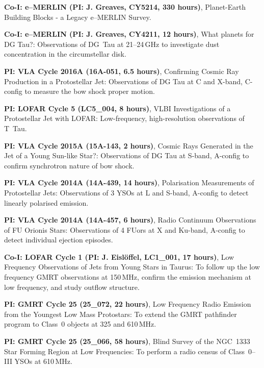 
\begin{cvpubs}
  \cvpub
    {
      \begin{cvlist}
        \item {\textbf{Co-I: e--MERLIN (PI: J. Greaves, CY5214, 330 hours)}, Planet-Earth Building Blocks - a Legacy e--MERLIN Survey.}
  \item {\textbf{Co-I: e--MERLIN (PI: J. Greaves, CY4211, 12 hours)}, What planets for DG Tau?: Observations of DG~Tau at 21--24\,GHz to investigate dust concentration in the circumstellar disk.}
  \item {\textbf{PI: VLA Cycle 2016A (16A-051, 6.5 hours)}, Confirming Cosmic Ray Production in a Protostellar Jet: Observations of DG Tau at C and X-band, C-config to measure the bow shock proper motion.}
  \item {\textbf{PI: LOFAR Cycle 5 (LC5\_004, 8 hours)}, VLBI Investigations of a Protostellar Jet with LOFAR: Low-frequency, high-resolution observations of T~Tau.}
  \item {\textbf{PI: VLA Cycle 2015A (15A-143, 2 hours)}, Cosmic Rays Generated in the Jet of a Young Sun-like Star?: Observations of DG Tau at S-band, A-config to confirm synchrotron nature of bow shock.}
  \item {\textbf{PI: VLA Cycle 2014A (14A-439, 14 hours)}, Polarisation Measurements of Protostellar Jets: Observations of 3 YSOs at L and S-band, A-config to detect linearly polarised emission.}
  \item {\textbf{PI: VLA Cycle 2014A (14A-457, 6 hours)}, Radio Continuum Observations of FU Orionis Stars: Observations of 4 FUors at X and Ku-band, A-config to detect individual ejection episodes.}
  \item {\textbf{Co-I: LOFAR Cycle 1 (PI: J. Eisl{\"o}ffel, LC1\_001, 17 hours)}, Low Frequency Observations of Jets from Young Stars in Taurus: To follow up the low frequency GMRT observations at 150\,MHz, confirm the emission mechanism at low frequency, and study outflow structure.}
  \item {\textbf{PI: GMRT Cycle 25 (25\_072, 22 hours)}, Low Frequency Radio Emission from the Youngest Low Mass Protostars: To extend the GMRT pathfinder program to Class~0 objects at 325 and 610\,MHz.}
  \item {\textbf{PI: GMRT Cycle 25 (25\_066, 58 hours)}, Blind Survey of the NGC~1333 Star Forming Region at Low Frequencies: To perform a radio census of Class~0--III YSOs at 610\,MHz.}
      \end{cvlist}
    }
\end{cvpubs}